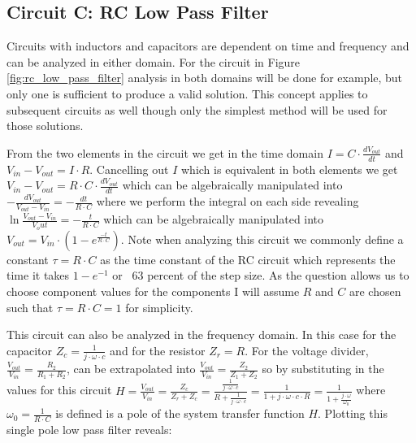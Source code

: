 \documentclass[main.tex]{subfiles}
\begin{document}


\subsection{Circuit C: RC Low Pass Filter}
Circuits with inductors and capacitors are dependent on time and frequency and can be analyzed in either domain. For the circuit in Figure \ref{fig:rc_low_pass_filter} analysis in both domains will be done for example, but only one is sufficient to produce a valid solution. This concept applies to subsequent circuits as well though only the simplest method will be used for those solutions.

From the two elements in the circuit we get in the time domain $I = C \cdot \frac{dV_{out}}{dt}$ and $V_{in} - V_{out} = I \cdot R$. Cancelling out $I$ which is equivalent in both elements we get $V_{in} - V_{out} = R \cdot C \cdot \frac{dV_{out}}{dt}$ which can be algebraically manipulated into $-\frac{dV_{out}}{V_{out}-V_{in}} = -\frac{dt}{R \cdot C}$ where we perform the integral on each side revealing $\ln{\frac{V_{out}-V_{in}}{V_out}}=-\frac{t}{R \cdot C}$ which can be algebraically manipulated into $V_{out}=V_{in} \cdot (1-e^{\frac{-t}{R \cdot C}})$. Note when analyzing this circuit we commonly define a constant $\tau = R \cdot C$ as the time constant of the RC circuit which represents the time it takes $1-e^{-1}$ or ~63 percent of the step size. As the question allows us to choose component values for the components I will assume $R$ and $C$ are chosen such that $\tau = R \cdot C = 1$ for simplicity.


This circuit can also be analyzed in the frequency domain. In this case for the capacitor $Z_c = \frac{1}{j \cdot \omega \cdot c}$ and for the resistor $Z_r = R$. For the voltage divider, $\frac{V_{out}}{V_{in}} = \frac{R_2}{R_1 + R_2}$, can be extrapolated into $\frac{V_{out}}{V_{in}} = \frac{Z_2}{Z_1 + Z_2}$ so by substituting in the values for this circuit $H = \frac{V_{out}}{V_{in}} = \frac{Z_c}{Z_r + Z_c} = \frac{\frac{1}{j \cdot \omega \cdot c}}{R + \frac{1}{j \cdot \omega \cdot c}} = \frac{1}{1 + j \cdot \omega \cdot c \cdot R} = \frac{1}{1+\frac{j \cdot \omega}{\omega_{0}}}$ where $\omega_{0} = \frac{1}{R \cdot C}$ is defined is a pole of the system transfer function $H$. Plotting this single pole low pass filter reveals:
\end{document}
